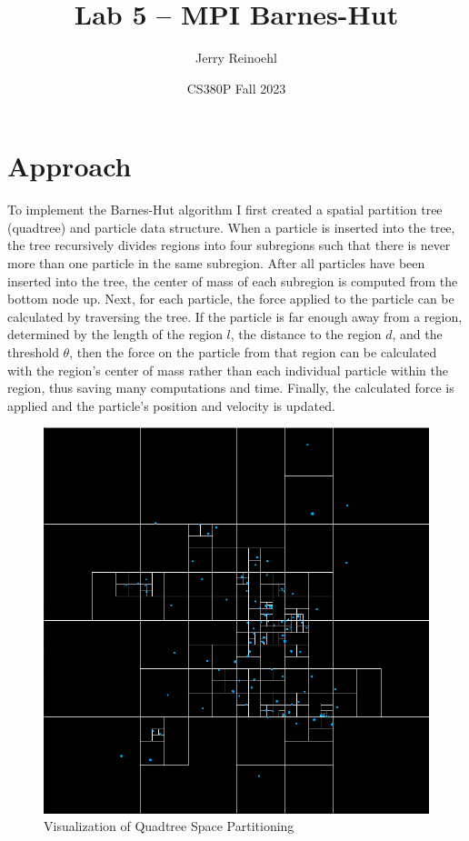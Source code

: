 \documentclass{article}
\title{Lab 5 -- MPI Barnes-Hut}
\author{Jerry Reinoehl}
\date{CS380P Fall 2023}
\begin{document}
\maketitle{}

\section{Approach}
To implement the Barnes-Hut algorithm I first created a spatial partition tree
(quadtree) and particle data structure.
When a particle is inserted into the tree, the tree recursively divides
regions into four subregions such that there is never more than one particle in
the same subregion.
After all particles have been inserted into the tree, the center of mass of
each subregion is computed from the bottom node up.
Next, for each particle, the force applied to the particle can be calculated
by traversing the tree.
If the particle is far enough away from a region, determined by the length of
the region $l$, the distance to the region $d$, and the threshold $\theta$,
then the force on the particle from that region can be calculated with the
region's center of mass rather than each individual particle within the region,
thus saving many computations and time.
Finally, the calculated force is applied and the particle's position and
velocity is updated.

\begin{figure}[htbp]
  \centering
  \includegraphics[scale=0.4]{tree.png}
  \caption{Visualization of Quadtree Space Partitioning}
\end{figure}
\end{document}
